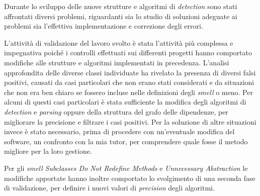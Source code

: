 Durante lo sviluppo delle nuove strutture e algoritmi di \textit{detection} sono stati affrontati diversi problemi, riguardanti sia lo studio di soluzioni adeguate ai problemi sia l'effettiva implementazione e correzione degli errori. 

L'attività di validazione del lavoro svolto è stata l'attività più complessa e impegnativa poiché i controlli effettuati sui differenti progetti hanno comportato modifiche alle strutture e algoritmi implementati in precedenza. L'analisi approfondita delle diverse classi individuate ha rivelato la presenza di diversi falsi positivi, causati da casi particolari che non erano stati considerati e da situazioni che non era ben chiaro se fossero incluse nelle definizioni degli \textit{smell} o meno. 
Per alcuni di questi casi particolari è stata sufficiente la modifica degli algoritmi di \textit{detection} e \textit{parsing} oppure della struttura del grafo delle dipendenze, per migliorare la precisione e filtrare i casi positivi. Per la soluzione di altre situazioni invece è stato necessario, prima di procedere con un'eventuale modifica del software, un confronto con la mia tutor, per comprendere quale fosse il metodo migliore per la loro gestione.

Per gli \textit{smell} \textit{Subclasses Do Not Redefine Methods} e \textit{Unnecessary Abstraction} le modifiche apportate hanno inoltre comportato lo svolgimento di una seconda fase di validazione, per definire i nuovi valori di \textit{precision} degli algoritmi.



